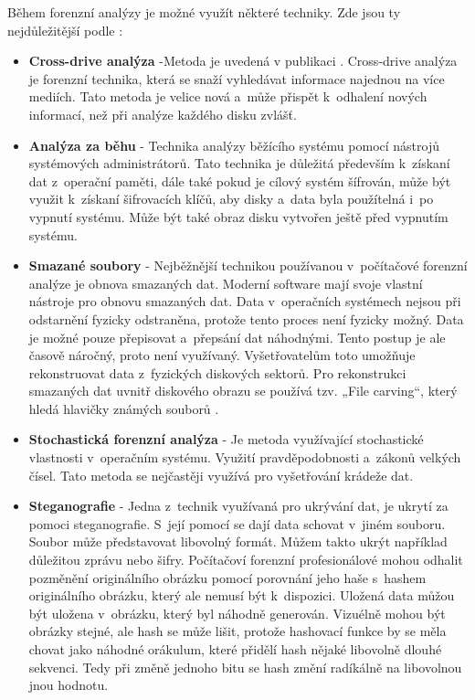 \documentclass[thesis=B,czech]{FITthesis}[2012/06/26]
\begin{document}
Během forenzní analýzy je možné využít některé techniky. Zde jsou ty nejdůležitější podle \cite{for_w}:
\begin{itemize}
\item \textbf{Cross-drive analýza} -Metoda je uvedená v publikaci \cite{garfinkel2006forensic}. Cross-drive analýza je forenzní technika, která se snaží vyhledávat informace najednou na více mediích. Tato metoda je velice nová a~může přispět k~odhalení nových informací, než při analýze každého disku zvlášť.

\item \textbf{Analýza za běhu} - Technika analýzy běžícího systému pomocí nástrojů systémových administrátorů. Tato technika je důležitá především k~získaní dat z~operační paměti, dále také pokud je cílový systém šífrován, může být využit k~získaní šifrovacích klíčů, aby disky a~data byla použítelná i~po vypnutí systému. Může být také obraz disku vytvořen ještě před vypnutím systému.

\item \textbf{Smazané soubory} - Nejběžnější technikou používanou v~počítačové forenzní analýze je obnova smazaných dat. Moderní software mají svoje vlastní nástroje pro obnovu smazaných dat. Data v~operačních systémech nejsou při odstarnění fyzicky odstraněna, protože tento proces není fyzicky možný. Data je možné pouze přepisovat a~přepsání dat náhodnými. Tento postup je ale časově náročný,  proto není využívaný. Vyšetřovatelům toto umožňuje rekonstruovat data z~fyzických diskových sektorů. Pro rekonstrukci smazaných dat uvnitř diskového obrazu se používá tzv. „File carving“, který hledá hlavičky známých souborů \cite{for_w}. 

\item \textbf{Stochastická forenzní analýza} - Je metoda využívající stochastické vlastnosti v~operačním systému. Využití pravděpodobnosti a~zákonů velkých čísel. Tato metoda se nejčastěji využívá pro vyšetřování krádeže dat.

\item \textbf{Steganografie} - Jedna z~technik využívaná pro ukrývání dat, je ukrytí za pomoci steganografie. S~její pomocí se dají data schovat v~jiném souboru. Soubor může představovat libovolný formát. Můžem takto ukrýt například důležitou zprávu nebo šifry. Počítačoví forenzní profesionálové mohou odhalit pozměnění originálního obrázku pomocí porovnání jeho haše s~hashem originálního obrázku, který ale nemusí být k~dispozici. Uložená data můžou být uložena v~obrázku, který byl náhodně generován. Vizuélně mohou být obrázky stejné, ale hash se může lišit, protože hashovací funkce by se měla chovat jako náhodné orákulum, které přidělí hash nějaké libovolně dlouhé sekvenci. Tedy při změně jednoho bitu se hash změní radíkálně na libovolnou jnou hodnotu.
\end{itemize}
\end{document}
